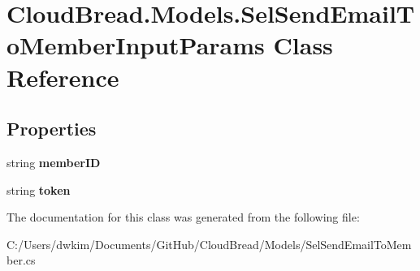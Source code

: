 \hypertarget{a00104}{}\section{Cloud\+Bread.\+Models.\+Sel\+Send\+Email\+To\+Member\+Input\+Params Class Reference}
\label{a00104}
\subsection*{Properties}
\begin{DoxyCompactItemize}
\item 
string {\bfseries member\+ID}\hypertarget{a00104_a4bcb616ed09c7e73fb33a00bdfe9a088}{}\label{a00104_a4bcb616ed09c7e73fb33a00bdfe9a088}

\item 
string {\bfseries token}\hypertarget{a00104_a6d31a32d68c92ddcffbf5be60e26556d}{}\label{a00104_a6d31a32d68c92ddcffbf5be60e26556d}

\end{DoxyCompactItemize}


The documentation for this class was generated from the following file\+:\begin{DoxyCompactItemize}
\item 
C\+:/\+Users/dwkim/\+Documents/\+Git\+Hub/\+Cloud\+Bread/\+Models/Sel\+Send\+Email\+To\+Member.\+cs\end{DoxyCompactItemize}
